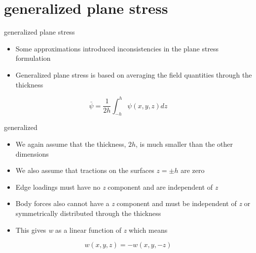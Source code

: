 \documentclass[
  letterpaper,
  ignorenonframetext,
  aspectratio=43,
  handout,
  12pt]{beamer}
\providecommand{\tightlist}{%
  \setlength{\itemsep}{0pt}\setlength{\parskip}{0pt}}
\providecommand{\tightlist}{%
\setlength{\itemsep}{0pt}\setlength{\parskip}{0pt}}
\begin{document}
\hypertarget{generalized-plane-stress}{%
\section{generalized plane stress}\label{generalized-plane-stress}}

\begin{frame}{generalized plane stress}
\protect\hypertarget{generalized-plane-stress-1}{}
\begin{itemize}
\tightlist
\item
  Some approximations introduced inconsistencies in the plane stress
  formulation
\item
  Generalized plane stress is based on averaging the field quantities
  through the thickness
\end{itemize}

\[\bar{\psi} = \frac{1}{2h} \int_{-h}^{h}\psi (x,y,z) dz\]
\end{frame}

\begin{frame}{generalized}
\protect\hypertarget{generalized}{}
\begin{itemize}
\tightlist
\item
  We again assume that the thickness, \(2h\), is much smaller than the
  other dimensions
\item
  We also assume that tractions on the surfaces \(z = \pm h\) are zero
\item
  Edge loadings must have no \emph{z} component and are independent of
  \emph{z}
\item
  Body forces also cannot have a \emph{z} component and must be
  independent of \emph{z} or symmetrically distributed through the
  thickness
\item
  This gives \emph{w} as a linear function of \emph{z} which means
\end{itemize}

\[w(x,y,z) = -w(x,y,-z)\]
\end{frame}
\end{document}
